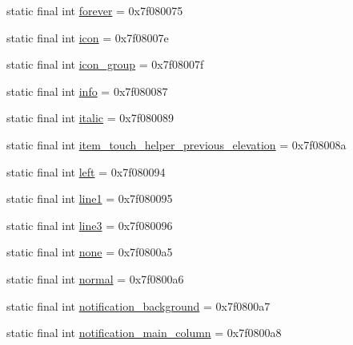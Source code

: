 \begin{DoxyCompactItemize}
\item 
static final int \mbox{\hyperlink{classandroid_1_1support_1_1v7_1_1recyclerview_1_1_r_1_1id_a22c27e2ae47d30605c44c3a48b1f2fb7}{forever}} = 0x7f080075
\item 
static final int \mbox{\hyperlink{classandroid_1_1support_1_1v7_1_1recyclerview_1_1_r_1_1id_a0258f338bdda76b913eab68362944537}{icon}} = 0x7f08007e
\item 
static final int \mbox{\hyperlink{classandroid_1_1support_1_1v7_1_1recyclerview_1_1_r_1_1id_a031a504af71bacf3b5cebafe39be7ef1}{icon\+\_\+group}} = 0x7f08007f
\item 
static final int \mbox{\hyperlink{classandroid_1_1support_1_1v7_1_1recyclerview_1_1_r_1_1id_a1e3b72ba68917db80be318439989b3e0}{info}} = 0x7f080087
\item 
static final int \mbox{\hyperlink{classandroid_1_1support_1_1v7_1_1recyclerview_1_1_r_1_1id_a39cdd776ad969b76fdbfc2ef613e70cc}{italic}} = 0x7f080089
\item 
static final int \mbox{\hyperlink{classandroid_1_1support_1_1v7_1_1recyclerview_1_1_r_1_1id_a352aa4de609b37793eb654583f20c49c}{item\+\_\+touch\+\_\+helper\+\_\+previous\+\_\+elevation}} = 0x7f08008a
\item 
static final int \mbox{\hyperlink{classandroid_1_1support_1_1v7_1_1recyclerview_1_1_r_1_1id_ac347b5f0466089f6370289b5ea923b6b}{left}} = 0x7f080094
\item 
static final int \mbox{\hyperlink{classandroid_1_1support_1_1v7_1_1recyclerview_1_1_r_1_1id_af6533e109a73fa5115fe4b5cab55a198}{line1}} = 0x7f080095
\item 
static final int \mbox{\hyperlink{classandroid_1_1support_1_1v7_1_1recyclerview_1_1_r_1_1id_abc21aba6639e4fd828ebff54f53eac5f}{line3}} = 0x7f080096
\item 
static final int \mbox{\hyperlink{classandroid_1_1support_1_1v7_1_1recyclerview_1_1_r_1_1id_adf2383f9c00605856555732e323328d5}{none}} = 0x7f0800a5
\item 
static final int \mbox{\hyperlink{classandroid_1_1support_1_1v7_1_1recyclerview_1_1_r_1_1id_aa12718636a0299bf9ad6966c0bfb6117}{normal}} = 0x7f0800a6
\item 
static final int \mbox{\hyperlink{classandroid_1_1support_1_1v7_1_1recyclerview_1_1_r_1_1id_aa00fb481f9af72f8598735bf245d80dc}{notification\+\_\+background}} = 0x7f0800a7
\item 
static final int \mbox{\hyperlink{classandroid_1_1support_1_1v7_1_1recyclerview_1_1_r_1_1id_a958f3f5dac93ab9d88fcef1e01f74360}{notification\+\_\+main\+\_\+column}} = 0x7f0800a8

\end{DoxyCompactItemize}
